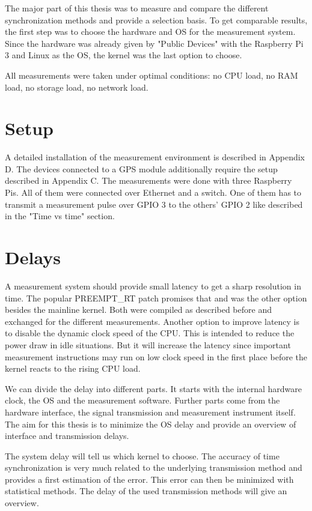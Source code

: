 The major part of this thesis was to measure and compare the different synchronization methods and provide a selection basis. To get comparable results, the first step was to choose the hardware and OS for the measurement system. Since the hardware was already given by "Public Devices" with the Raspberry Pi 3 and Linux as the OS, the kernel was the last option to choose.

All measurements were taken under optimal conditions: no CPU load, no RAM load, no storage load, no network load.

\section{Setup}

A detailed installation of the measurement environment is described in Appendix D. The devices connected to a GPS module additionally require the setup described in Appendix C.
The measurements were done with three Raspberry Pis. All of them were connected over Ethernet and a switch. One of them has to transmit a measurement pulse over GPIO 3 to the others’ GPIO 2 like described in the "Time vs time" section.

\section{Delays}

A measurement system should provide small latency to get a sharp resolution in time. The popular PREEMPT\_RT patch promises that and was the other option besides the mainline kernel. Both were compiled as described before and exchanged for the different measurements.
Another option to improve latency is to disable the dynamic clock speed of the CPU. This is intended to reduce the power draw in idle situations. But it will increase the latency since important measurement instructions may run on low clock speed in the first place before the kernel reacts to the rising CPU load.

We can divide the delay into different parts. It starts with the internal hardware clock, the OS and the measurement software. Further parts come from the hardware interface, the signal transmission and measurement instrument itself. The aim for this thesis is to minimize the OS delay and provide an overview of interface and transmission delays.

The system delay will tell us which kernel to choose. The accuracy of time synchronization is very much related to the underlying transmission method and provides a first estimation of the error. This error can then be minimized with statistical methods. The delay of the used transmission methods will give an overview.

